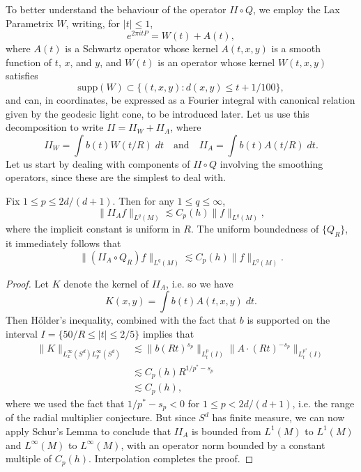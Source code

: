 To better understand the behaviour of the operator $II \circ Q$, we employ the Lax Parametrix $W$, writing, for $|t| \leq 1$,
%
\[ e^{2 \pi i t P} = W(t) + A(t), \]
%
where $A(t)$ is a Schwartz operator whose kernel $A(t,x,y)$ is a smooth function of $t$, $x$, and $y$, and $W(t)$ is an operator whose kernel $W(t,x,y)$ satisfies
%
\[ \text{supp}(W) \subset \{ (t,x,y) : d(x,y) \leq t + 1 / 100 \}, \]
%
and can, in coordinates, be expressed as a Fourier integral with canonical relation given by the geodesic light cone, to be introduced later. Let us use this decomposition to write $II = II_W + II_A$, where
%
\[ II_W = \int b(t) W(t / R)\; dt \quad\text{and}\quad II_A = \int b(t) A(t / R)\; dt. \]
%
%
%
Let us start by dealing with components of $II \circ Q$ involving the smoothing operators, since these are the simplest to deal with.

\begin{lemma} \label{IIALemma}
    Fix $1 \leq p \leq 2d/(d+1)$. Then for any $1 \leq q \leq \infty$,
    \[ \| II_A f \|_{L^q(M)} \lesssim C_p(h) \| f \|_{L^q(M)}, \]
    where the implicit constant is uniform in $R$. The uniform boundedness of $\{ Q_R \}$, it immediately follows that
    \[ \| (II_A \circ Q_R) f \|_{L^q(M)} \lesssim C_p(h) \| f \|_{L^q(M)}. \]
\end{lemma}
\begin{proof}
    Let $K$ denote the kernel of $II_A$, i.e. so we have
    \[ K(x,y) = \int b(t) A(t,x,y)\; dt. \]
    Then H\"{o}lder's inequality, combined with the fact that $b$ is supported on the interval $I = \{ 50/R \leq |t| \leq 2/5 \}$ implies that
    \begin{align*}
        \| K \|_{L^\infty_x(S^d) L^\infty_y(S^d)} &\lesssim \| b (R t)^{s_p} \|_{L^p_t(I)} \| A \cdot (R t)^{-s_p} \|_{L^{p^*}_t(I)}\\
        &\lesssim C_p(h) R^{1/p^* - s_p}\\
        &\lesssim C_p(h),
    \end{align*}
    where we used the fact that $1/p^* - s_p < 0$ for $1 \leq p < 2d/(d+1)$, i.e. the range of the radial multiplier conjecture. But since $S^d$ has finite measure, we can now apply Schur's Lemma to conclude that $II_A$ is bounded from $L^1(M)$ to $L^1(M)$ and $L^\infty(M)$ to $L^\infty(M)$, with an operator norm bounded by a constant multiple of $C_p(h)$. Interpolation completes the proof.
\end{proof}

